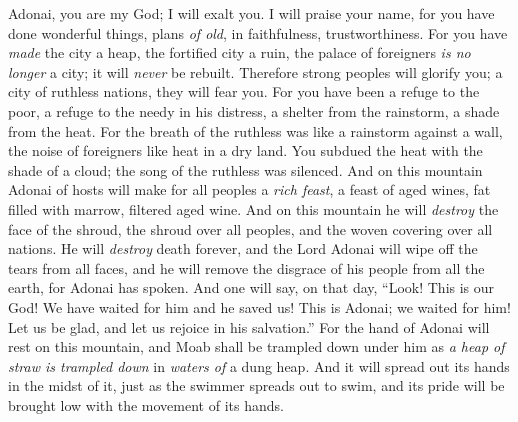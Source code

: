 \begin{biblechapter} %
 Adonai, you are my God; I will exalt you. 
I will praise your name, 
for you have done wonderful things, 
plans \textit{of old}, in faithfulness, trustworthiness.
\verse For you have \textit{made} the city a heap, 
the fortified city a ruin, 
the palace of foreigners \textit{is no longer} a city; 
it will \textit{never} be rebuilt.
\verse Therefore strong peoples will glorify you; 
a city of ruthless nations, they will fear you.
\verse For you have been a refuge to the poor, 
a refuge to the needy in his distress, 
a shelter from the rainstorm, 
a shade from the heat. 
For the breath of the ruthless was like a rainstorm against a wall,
\verse the noise of foreigners like heat in a dry land. 
You subdued the heat with the shade of a cloud; 
the song of the ruthless was silenced.
\verse And on this mountain Adonai of hosts will make for all peoples a \textit{rich feast}, 
a feast of aged wines, fat filled with marrow, filtered aged wine.
\verse And on this mountain he will \textit{destroy} the face of the shroud, 
the shroud over all peoples, 
and the woven covering over all nations.
\verse He will \textit{destroy} death forever, 
and the Lord Adonai will wipe off the tears from all faces, 
and he will remove the disgrace of his people from all the earth, for Adonai has spoken.
\verse And one will say, on that day,
\verse “Look! This is our God! We have waited for him and he saved us! 
This is Adonai; we waited for him! 
Let us be glad, 
and let us rejoice in his salvation.”
\verse For the hand of Adonai will rest on this mountain, 
and Moab shall be trampled down under him 
as \textit{a heap of straw is trampled down} in \textit{waters of} a dung heap.
\verse And it will spread out its hands in the midst of it, 
just as the swimmer spreads out to swim, 
and its pride will be brought low with the movement of its hands.
\end{biblechapter}


